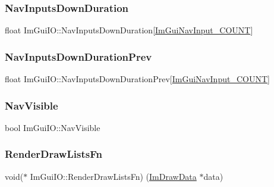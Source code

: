 \subsubsection{\texorpdfstring{Nav\+Inputs\+Down\+Duration}{NavInputsDownDuration}}
{\footnotesize\ttfamily float Im\+Gui\+I\+O\+::\+Nav\+Inputs\+Down\+Duration\mbox{[}\mbox{\hyperlink{imgui_8h_a1b685ae2d3bd43e9665e1b3e0f578117a649aced582f4c80f70b83814051ffcb3}{Im\+Gui\+Nav\+Input\+\_\+\+C\+O\+U\+NT}}\mbox{]}}

\mbox{\label{struct_im_gui_i_o_ae2301639fd3e881177815d3b0133068f}} 
\subsubsection{\texorpdfstring{Nav\+Inputs\+Down\+Duration\+Prev}{NavInputsDownDurationPrev}}
{\footnotesize\ttfamily float Im\+Gui\+I\+O\+::\+Nav\+Inputs\+Down\+Duration\+Prev\mbox{[}\mbox{\hyperlink{imgui_8h_a1b685ae2d3bd43e9665e1b3e0f578117a649aced582f4c80f70b83814051ffcb3}{Im\+Gui\+Nav\+Input\+\_\+\+C\+O\+U\+NT}}\mbox{]}}

\mbox{\label{struct_im_gui_i_o_a904bb563ee00c92cc6b6b072df2c7405}} 
\subsubsection{\texorpdfstring{Nav\+Visible}{NavVisible}}
{\footnotesize\ttfamily bool Im\+Gui\+I\+O\+::\+Nav\+Visible}

\mbox{\label{struct_im_gui_i_o_ae16a9f25f36fe9706d8a33fb128e538a}} 
\subsubsection{\texorpdfstring{Render\+Draw\+Lists\+Fn}{RenderDrawListsFn}}
{\footnotesize\ttfamily void($\ast$ Im\+Gui\+I\+O\+::\+Render\+Draw\+Lists\+Fn) (\mbox{\hyperlink{struct_im_draw_data}{Im\+Draw\+Data}} $\ast$data)}

